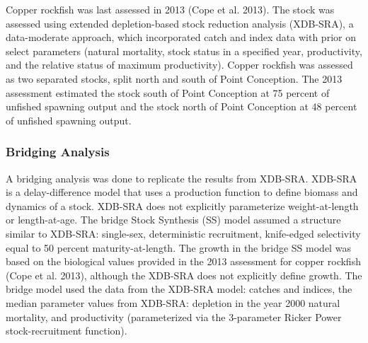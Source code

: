\documentclass[11pt,
  english,
  a4paper,
]{article}
\begin{document}
\leavevmode\tagmcend\tagstructend


Copper rockfish was last assessed in 2013 {(Cope et al. 2013)\leavevmode\tagmcend\tagstructend}. The stock was assessed using extended depletion-based stock reduction analysis (XDB-SRA), a data-moderate approach, which incorporated catch and index data with prior on select parameters (natural mortality, stock status in a specified year, productivity, and the relative status of maximum productivity). Copper rockfish was assessed as two separated stocks, split north and south of Point Conception. The 2013 assessment estimated the stock south of Point Conception at 75 percent of unfished spawning output and the stock north of Point Conception at 48 percent of unfished spawning output.

\leavevmode\tagmcend\tagstructend\par


\hypertarget{bridging-analysis}{%
\subsubsection{Bridging Analysis}\label{bridging-analysis}}

\leavevmode\tagmcend\tagstructend


A bridging analysis was done to replicate the results from XDB-SRA. XDB-SRA is a delay-difference model that uses a production function to define biomass and dynamics of a stock. XDB-SRA does not explicitly parameterize weight-at-length or length-at-age. The bridge Stock Synthesis (SS) model assumed a structure similar to XDB-SRA: single-sex, deterministic recruitment, knife-edged selectivity equal to 50 percent maturity-at-length. The growth in the bridge SS model was based on the biological values provided in the 2013 assessment for copper rockfish {(Cope et al. 2013)\leavevmode\tagmcend\tagstructend}, although the XDB-SRA does not explicitly define growth. The bridge model used the data from the XDB-SRA model: catches and indices, the median parameter values from XDB-SRA: depletion in the year 2000 natural mortality, and productivity (parameterized via the 3-parameter Ricker Power stock-recruitment function).
\end{document}
